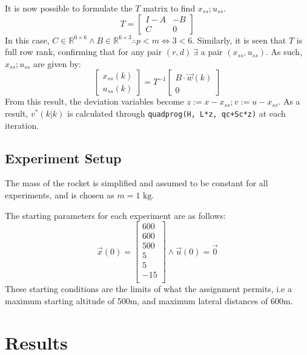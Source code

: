 \documentclass[conference, tikz]{IEEEtran}
\begin{document}
It is now possible to formulate the $T$ matrix to find $x_{ss};u_{ss}$.
\[
    T = 
    \begin{bmatrix}
        I-A & -B\\
        C & 0
    \end{bmatrix}
\]
In this case, $C \in \mathbb{R}^{6 \times 6} \land B \in \mathbb{R}^{6 \times 3} \therefore p < m \iff 3 < 6$.
Similarly, it is seen that $T$ is full row rank, confirming that for any pair $ (r, d) \ \exists$ a pair $(x_{ss}, u_{ss})$.
As such, $x_{ss};u_{ss}$ are given by:
\[
    \begin{bmatrix}
        x_{ss}(k)\\
        u_{ss}(k)
    \end{bmatrix}
    =
    T^{-1}
    \begin{bmatrix}
        B\cdot \vec w(k)\\

        0
    \end{bmatrix}
\]
From this result, the deviation variables become $ z := x - x_{ss}; v := u - x_{ss}$. 
As a result, $v^*(k|k)$ is calculated through \verb|quadprog(H, L*z, qc+Sc*z)| at each iteration.

\subsection{Experiment Setup}
The mass of the rocket is simplified and assumed to be constant for all experiments, and is chosen as $m = 1\text{ kg}$.

The starting parameters for each experiment are as follows:
\[
    \vec x(0)
        =
        \begin{bmatrix}
            600\\
            600\\
            500\\
            5\\
            5\\
            -15\\
        \end{bmatrix}
        \land
        \vec u(0)
        = \vec 0
\]
These starting conditions are the limits of what the assignment permits, i.e a maximum starting altitude of 500m, and  maximum lateral distances of 600m.

\pagebreak
\section{Results}
\end{document}
